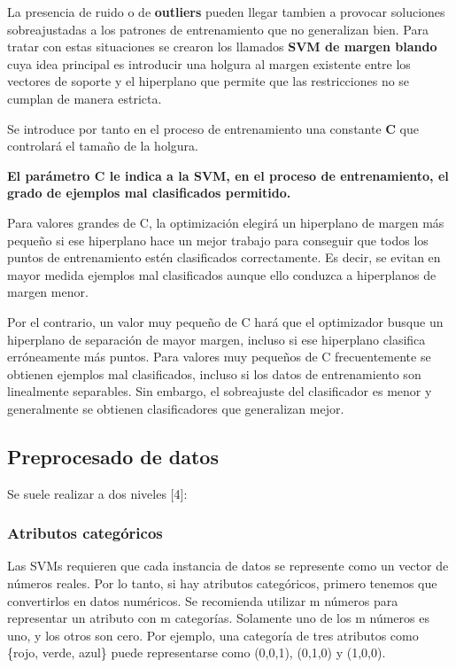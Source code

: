 \documentclass[11pt]{article}
\begin{document}
La presencia de ruido o de \textbf{outliers} pueden llegar tambien a
provocar soluciones sobreajustadas a los patrones de entrenamiento que
no generalizan bien. Para tratar con estas situaciones se crearon los
llamados \textbf{SVM de margen blando} cuya idea principal es introducir
una holgura al margen existente entre los vectores de soporte y el
hiperplano que permite que las restricciones no se cumplan de manera
estricta.

Se introduce por tanto en el proceso de entrenamiento una constante
\textbf{C} que controlará el tamaño de la holgura.

\textbf{El parámetro C le indica a la SVM, en el proceso de
entrenamiento, el grado de ejemplos mal clasificados permitido.}

Para valores grandes de C, la optimización elegirá un hiperplano de
margen más pequeño si ese hiperplano hace un mejor trabajo para
conseguir que todos los puntos de entrenamiento estén clasificados
correctamente. Es decir, se evitan en mayor medida ejemplos mal
clasificados aunque ello conduzca a hiperplanos de margen menor.

Por el contrario, un valor muy pequeño de C hará que el optimizador
busque un hiperplano de separación de mayor margen, incluso si ese
hiperplano clasifica erróneamente más puntos. Para valores muy pequeños
de C frecuentemente se obtienen ejemplos mal clasificados, incluso si
los datos de entrenamiento son linealmente separables. Sin embargo, el
sobreajuste del clasificador es menor y generalmente se obtienen
clasificadores que generalizan mejor.

\subsection{Preprocesado de datos}\label{preprocesado-de-datos}

Se suele realizar a dos niveles {[}4{]}:

\subsubsection{Atributos categóricos}\label{atributos-categuxf3ricos}

Las SVMs requieren que cada instancia de datos se represente como un
vector de números reales. Por lo tanto, si hay atributos categóricos,
primero tenemos que convertirlos en datos numéricos. Se recomienda
utilizar m números para representar un atributo con m categorías.
Solamente uno de los m números es uno, y los otros son cero. Por
ejemplo, una categoría de tres atributos como \{rojo, verde, azul\}
puede representarse como (0,0,1), (0,1,0) y (1,0,0).
\end{document}
